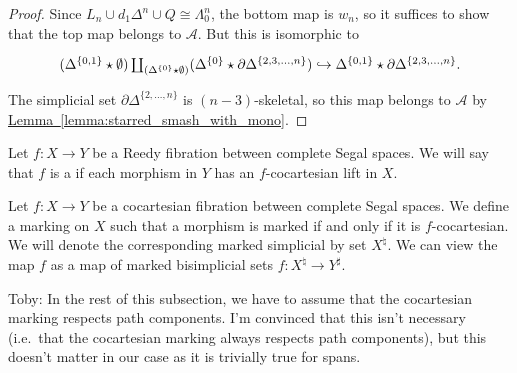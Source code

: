 \documentclass[main.tex]{subfiles}
\begin{document}
\begin{proof}
  Since $L_{n} \cup d_{1} \Delta^{n} \cup Q \cong \Lambda^{n}_{0}$, the bottom map is $w_{n}$, so it suffices to show that the top map belongs to $\mathcal{A}$. But this is isomorphic to
  \begin{equation*}
    \begin{tikzcd}
      (\Delta^{\{0, 1\}} \star \emptyset) \coprod_{(\Delta^{\{0\}} \star \emptyset)} (\Delta^{\{0\}} \star \partial \Delta^{\{2, 3, \ldots, n\}}) \hookrightarrow \Delta^{\{0, 1\}} \star \partial \Delta^{\{2, 3, \ldots, n\}}.
    \end{tikzcd}
  \end{equation*}
  The simplicial set $\partial \Delta^{\{2, \ldots, n\}}$ is $(n-3)$-skeletal, so this map belongs to $\mathcal{A}$ by \hyperref[lemma:starred_smash_with_mono]{Lemma~\ref*{lemma:starred_smash_with_mono}}.
\end{proof}

\begin{definition}
  \label{def:cocartesian_fibration_between_complete_segal_spaces}
  Let $f\colon X \to Y$ be a Reedy fibration between complete Segal spaces. We will say that $f$ is a  if each morphism in $Y$ has an $f$-cocartesian lift in $X$.
\end{definition}

\begin{definition}
  \label{def:cocoartesian_marking_on_complete_segal_spaces}
  Let $f\colon X \to Y$ be a cocartesian fibration between complete Segal spaces. We define a marking on $X$ such that a morphism is marked if and only if it is $f$-cocartesian. We will denote the corresponding marked simplicial by set $X^{\natural}$. We can view the map $f$ as a map of marked bisimplicial sets $f\colon X^{\natural} \to Y^{\sharp}$.
\end{definition}


\begin{note}
  Toby: In the rest of this subsection, we have to assume that the cocartesian marking respects path components. I'm convinced that this isn't necessary (i.e.\ that the cocartesian marking always respects path components), but this doesn't matter in our case as it is trivially true for spans.
\end{note}
\end{document}
